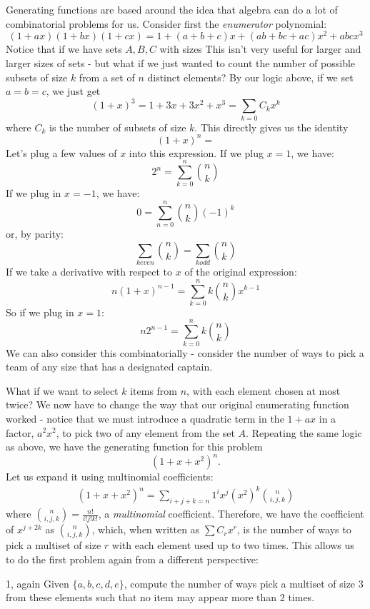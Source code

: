 \documentclass[11pt,twosided]{article}
\begin{document}
\section{}
Generating functions are based around the idea that algebra can do a lot of combinatorial problems for us. 
Consider first the \textit{enumerator} polynomial:
\[
	(1+ax)(1+bx)(1+cx) = 1 + (a+b+c) x + (ab + bc + ac)x^2 + abcx^3 
\]
Notice that if we have sets $A, B, C$ with sizes 
This isn't very useful for larger and larger sizes of sets - but what if we just wanted to count the number of possible subsets of size $k$ from a set of $n$ distinct elements? By our logic above, if we set $a = b = c$, we just get 
\[
	(1+x)^3 = 1 + 3x + 3x^2 + x^3 = \sum_{k=0} C_k x^k 
\]
where $C_k$ is the number of subsets of size $k$. This directly gives us the identity 
\[
	(1+x)^n = 
\]
Let's plug a few values of $x$ into this expression. If we plug $x = 1$, we have: 
\[
	2^n = \sum_{k=0}^{n} \binom{n}{k}
\]
If we plug in $x = -1$, we have: 
\[
	0 = \sum_{n=0}^{n} \binom{n}{k} (-1)^k 
\]
or, by parity: 
\[
	\sum_{k even} \binom{n}{k} = \sum_{k odd} \binom{n}{k} 
\]
If we take a derivative with respect to $x$ of the original expression: 
\[
	n(1+x)^{n-1} = \sum_{k=0}^{n} k \binom{n}{k} x^{k-1}
\]
So if we plug in $x = 1$: 
\[
	n2^{n-1} = \sum_{k=0}^{n} k \binom{n}{k}
\]
We can also consider this combinatorially - consider the number of ways to pick a team of any size that has a designated captain. 

What if we want to select $k$ items from $n$, with each element chosen at most twice? We now have to change the way that our original enumerating function worked - notice that we must introduce a quadratic term in the $1+ax$ in a factor, $a^2x^2$, to pick two of any element from the set $A$. Repeating the same logic as above, we have the generating function for this problem 
\[
	(1+x+x^2)^n.
\]
Let us expand it using multinomial coefficients: 
\begin{align*}
 (1+x+x^2)^n = \sum_{i+j+k=n} 1^i x^j (x^2)^k \binom{n}{i, j, k}
\end{align*}
where $\binom{n}{i, j, k} = \frac{n!}{i!j!k!}$, a \textit{multinomial} coefficient. Therefore, we have the coefficient of $x^{j+2k}$ as $\binom{n}{i, j, k}$, which, when written as $\sum C_rx^r$, is the number of ways to pick a multiset of size $r$ with each element used up to two times. This allows us to do the first problem again from a different perspective: 

\begin{problem}{1, again}
	Given $\{ a, b, c, d, e \}$, compute the number of ways pick a multiset of size $3$ from these elements such that no item may appear more than 2 times. 
\end{problem}
\end{document}
